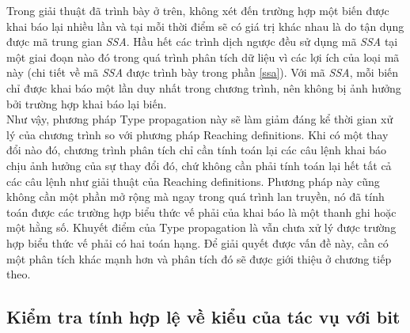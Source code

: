 Trong giải thuật đã trình bày ở trên, không xét đến trường hợp một biến được khai báo lại nhiều lần và tại mỗi thời điểm sẽ có giá trị khác nhau là do tận dụng được mã trung gian \textit{SSA}. Hầu hết các trình dịch ngược đều sử dụng mã \textit{SSA} tại một giai đoạn nào đó trong quá trình phân tích dữ liệu vì các lợi ích của loại mã này (chi tiết về mã \textit{SSA} được trình bày trong phần \ref{ssa}). Với mã \textit{SSA}, mỗi biến chỉ được khai báo một lần duy nhất trong chương trình, nên không bị ảnh hưởng bởi trường hợp khai báo lại biến.\\

Như vậy, phương pháp Type propagation này sẽ làm giảm đáng kể thời gian xử lý của chương trình so với phương pháp Reaching definitions. Khi có một thay đổi nào đó, chương trình phân tích chỉ cần tính toán lại các câu lệnh khai báo chịu ảnh hưởng của sự thay đổi đó, chứ không cần phải tính toán lại hết tất cả các câu lệnh như giải thuật của Reaching definitions. Phương pháp này cũng không cần một phần mở rộng mà ngay trong quá trình lan truyền, nó đã tính toán được các trường hợp biểu thức vế phải của khai báo là một thanh ghi hoặc một hằng số. Khuyết điểm của Type propagation là vẫn chưa xử lý được trường hợp biểu thức vế phải có hai toán hạng. Để giải quyết được vấn đề này, cần có một phân tích khác mạnh hơn và phân tích đó sẽ được giới thiệu ở chương tiếp theo.
\subsection{Kiểm tra tính hợp lệ về kiểu của tác vụ với bit}

\label{sec:laststep}

